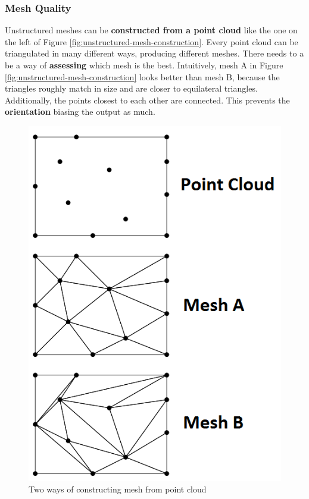 \documentclass{article}
\begin{document}
\subsubsection{Mesh Quality}
\label{sec:mesh-quality}

Unstructured meshes can be \textbf{constructed from a point cloud} like the one on the left of Figure \ref{fig:unstructured-mesh-construction}. Every point cloud can be triangulated in many different ways, producing different meshes. There needs to a be a way of \textbf{assessing} which mesh is the best. Intuitively, mesh A in Figure \ref{fig:unstructured-mesh-construction} looks better than mesh B, because the triangles roughly match in size and are closer to equilateral triangles. Additionally, the points closest to each other are connected. This prevents the \textbf{orientation} biasing the output as much.

\begin{figure}
	\centering
	\includegraphics[scale=0.35]{figures/mesh-quality-example.png}
	\caption{Two ways of constructing mesh from point cloud}
	\label{fig:unstructered-mesh-construction}
\end{figure}
\end{document}
